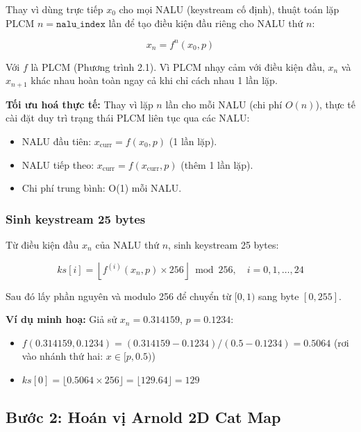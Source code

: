 Thay vì dùng trực tiếp $x_0$ cho mọi NALU (keystream cố định), thuật toán
lặp PLCM $n = \texttt{nalu\_index}$ lần để tạo điều kiện đầu riêng cho NALU thứ $n$:

\begin{equation}
x_n = f^n(x_0, p)
\label{eq:plcm_advance}
\end{equation}

Với $f$ là PLCM (Phương trình 2.1). Vì PLCM nhạy cảm với điều kiện đầu,
$x_n$ và $x_{n+1}$ khác nhau hoàn toàn ngay cả khi chỉ cách nhau 1 lần lặp.

\textbf{Tối ưu hoá thực tế:} Thay vì lặp $n$ lần cho mỗi NALU (chi phí $O(n)$),
thực tế cài đặt duy trì trạng thái PLCM liên tục qua các NALU:
\begin{itemize}
  \item NALU đầu tiên: $x_{\text{curr}} = f(x_0, p)$ (1 lần lặp).
  \item NALU tiếp theo: $x_{\text{curr}} = f(x_{\text{curr}}, p)$ (thêm 1 lần lặp).
  \item Chi phí trung bình: O(1) mỗi NALU.
\end{itemize}

\subsubsection{Sinh keystream 25 bytes}

Từ điều kiện đầu $x_n$ của NALU thứ $n$, sinh keystream 25 bytes:

\begin{equation}
ks[i] = \left\lfloor f^{(i)}(x_n, p) \times 256 \right\rfloor \bmod 256, \quad i = 0, 1, \ldots, 24
\end{equation}

Sau đó lấy phần nguyên và modulo 256 để chuyển từ $[0, 1)$ sang byte $[0, 255]$.

\textbf{Ví dụ minh hoạ:} Giả sử $x_n = 0.314159$, $p = 0.1234$:
\begin{itemize}
  \item $f(0.314159, 0.1234) = (0.314159 - 0.1234) / (0.5 - 0.1234) = 0.5064$
        (rơi vào nhánh thứ hai: $x \in [p, 0.5)$)
  \item $ks[0] = \lfloor 0.5064 \times 256 \rfloor = \lfloor 129.64 \rfloor = 129$
\end{itemize}

\subsection{Bước 2: Hoán vị Arnold 2D Cat Map}

